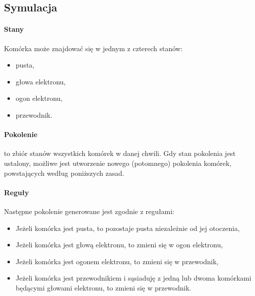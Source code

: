 \documentclass{report}
\begin{document}
\subsection{Symulacja}
\begin{minipage}{\textwidth} %
    \paragraph{Stany}  Komórka może znajdować się w jednym z czterech stanów:
    \begin{itemize}
    \item pusta,
    \item głowa elektronu,
    \item ogon elektronu,
    \item przewodnik.
    \end{itemize}
\end{minipage}

\paragraph{Pokolenie} to zbiór stanów wszystkich komórek w danej chwili. Gdy stan pokolenia jest ustalony, możliwe jest utworzenie nowego (potomnego) pokolenia komórek, powstających według poniższych zasad.

\paragraph{Reguły} Następne pokolenie generowane jest zgodnie z regułami:
\begin{itemize}
\item Jeżeli komórka jest pusta, to pozostaje pusta niezależnie od jej otoczenia,
\item Jeżeli komórka jest głową elektronu, to zmieni się w ogon elektronu,
\item Jeżeli komórka jest ogonem elektronu, to zmieni się w przewodnik,
\item Jeżeli komórka jest przewodnikiem i sąsiaduję z jedną lub dwoma komórkami będącymi głowami elektronu, to zmieni się w przewodnik.
\end{itemize}
\end{document}
